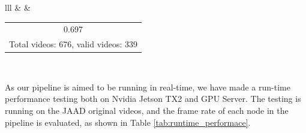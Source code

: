 \begin{table}[H]
\begin{tabular}{lll}
    &  &  
{\begin{tabular}[c]{@{}c@{}}0.697\\ Total videos: 676,  valid videos: 339\end{tabular}} \\ 
\hline
\end{tabular}
\label{tab:iou_result}
\end{table}

As our pipeline is aimed to be running in real-time, we have made a run-time performance testing both on Nvidia Jetson TX2 and GPU Server. The testing is running on the JAAD original videos, and the frame rate of each node in the pipeline is evaluated, as shown in Table \ref{tab:runtime_performace}.

